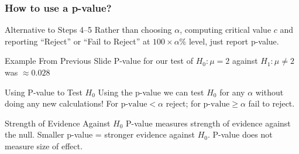 \begin{frame}
  \frametitle{How to use a p-value?}

  \small

  \begin{block}{Alternative to Steps 4--5}
   Rather than choosing $\alpha$, computing critical value $c$ and reporting ``Reject'' or ``Fail to Reject'' at $100\times \alpha\%$ level, just report p-value.
  \end{block}

  \pause

  \begin{alertblock}{Example From Previous Slide}
    P-value for our test of $H_0\colon \mu = 2$ against $H_1\colon \mu \neq 2$ was $\approx 0.028$
  \end{alertblock}

  \pause

  \begin{block}{Using P-value to Test $H_0$}
    Using the p-value we can test $H_0$ for \alert{any} $\alpha$ without doing any new calculations!
    For $\mbox{p-value} < \alpha$ reject; for $\mbox{p-value} \geq \alpha$ fail to reject.

  \end{block}

  \pause

  \begin{block}{Strength of Evidence Against $H_0$}
    P-value measures \alert{strength of evidence against the null}.
    Smaller p-value = stronger evidence against $H_0$.
    \alert{P-value does not measure size of effect}.
  \end{block}

\end{frame}

